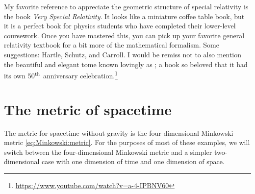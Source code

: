 My favorite reference to appreciate the geometric structure of special relativity is the book \emph{Very Special Relativity}\autocite{bais2007very}. It looks like a miniature coffee table book, but it is a perfect book for physics students who have completed their lower-level coursework. Once you have mastered this, you can pick up your favorite general relativity textbook for a bit more of the mathematical formalism. Some suggestions: Hartle\autocite{Hartle:2003yu}, Schutz\autocite{schutz2009first}, and Carroll\autocite{Carroll:2004st}. I would be remiss not to also mention the beautiful and elegant tome known lovingly as \autocite{misner2017gravitation}; a book so beloved that it had its own 50$^\textnormal{th}$ anniversary celebration.\footnote{\url{https://www.youtube.com/watch?v=a-4-IPBNV60}}



\section{The metric of spacetime}

The metric for spacetime without gravity is the four-dimensional Minkowski metric \eqref{eq:Minkowski:metric}. For the purposes of most of these examples, we will switch between the four-dimensional Minkowski metric and a simpler two-dimensional case with one dimension of time and one dimension of space. 

